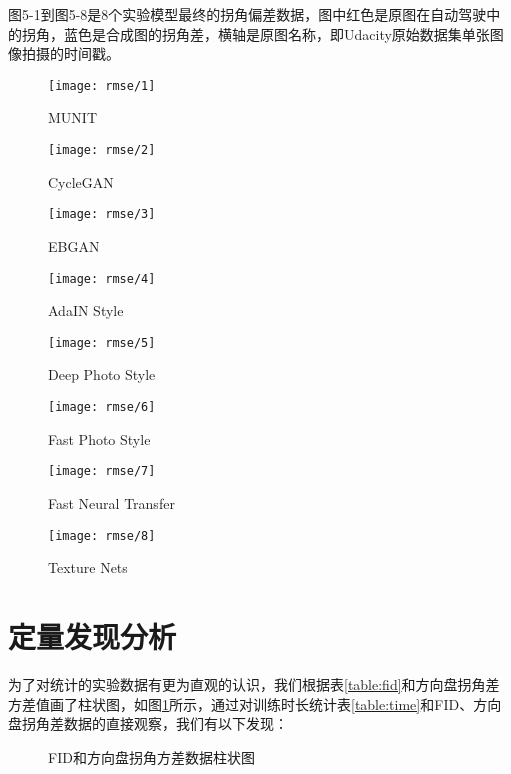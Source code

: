 图5-1到图5-8是8个实验模型最终的拐角偏差数据，图中红色是原图在自动驾驶中的拐角，蓝色是合成图的拐角差，横轴是原图名称，即Udacity原始数据集单张图像拍摄的时间戳。

\begin{figure}[!h]
    \texttt{[image: rmse/1]} 
    \caption{MUNIT}
\end{figure}
\begin{figure}[!h]
    \texttt{[image: rmse/2]} 
    \caption{CycleGAN}
\end{figure}
\begin{figure}[!h]
    \texttt{[image: rmse/3]} 
    \caption{EBGAN}
\end{figure}
\begin{figure}[!h]
    \texttt{[image: rmse/4]} 
    \caption{AdaIN Style}
\end{figure}
\begin{figure}[!h]
    \texttt{[image: rmse/5]} 
    \caption{Deep Photo Style}
\end{figure}
\begin{figure}[!h]
    \texttt{[image: rmse/6]} 
    \caption{Fast Photo Style}
\end{figure}
\begin{figure}[!h]
    \texttt{[image: rmse/7]} 
    \caption{Fast Neural Transfer}
\end{figure}
\begin{figure}[!h]
    \texttt{[image: rmse/8]} 
    \caption{Texture Nets}
\end{figure}

\section{定量发现分析}

为了对统计的实验数据有更为直观的认识，我们根据表\ref{table:fid}和方向盘拐角差方差值画了柱状图，如图\ref{fig:col}所示，通过对训练时长统计表\ref{table:time}和FID、方向盘拐角差数据的直接观察，我们有以下发现：

\begin{figure}[ht]
    \centering
    \caption{FID和方向盘拐角方差数据柱状图}
    \label{fig:col}
\end{figure}

